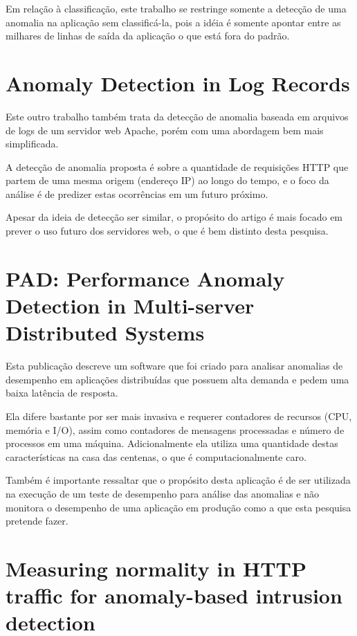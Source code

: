 Em relação à classificação, este trabalho se restringe somente a detecção de uma
anomalia na aplicação sem classificá-la, pois a idéia é somente apontar entre as
milhares de linhas de saída da aplicação o que está fora do padrão.

\section{Anomaly Detection in Log Records \citep{rastogi}}
\label{sec:anomaly-detection-in-log-records}

Este outro trabalho também trata da detecção de anomalia baseada em arquivos de
logs de um servidor web Apache, porém com uma abordagem bem mais simplificada.

A detecção de anomalia proposta é sobre a quantidade de requisições HTTP que
partem de uma mesma origem (endereço IP) ao longo do tempo, e o foco da análise
é de predizer estas ocorrências em um futuro próximo.

Apesar da ideia de detecção ser similar, o propósito do artigo é mais focado em
prever o uso futuro dos servidores web, o que é bem distinto desta pesquisa.

\section{PAD: Performance Anomaly Detection in Multi-server Distributed Systems \citep{pad}}
\label{sec:pad}

Esta publicação descreve um software que foi criado para analisar anomalias de
desempenho em aplicações distribuídas que possuem alta demanda e pedem uma baixa
latência de resposta.

Ela difere bastante por ser mais invasiva e requerer contadores de recursos
(CPU, memória e I/O), assim como contadores de mensagens processadas e número de
processos em uma máquina. Adicionalmente ela utiliza uma quantidade destas
características na casa das centenas, o que é computacionalmente caro.

Também é importante ressaltar que o propósito desta aplicação é de ser utilizada
na execução de um teste de desempenho para análise das anomalias e não monitora
o desempenho de uma aplicação em produção como a que esta pesquisa pretende fazer.

\section{Measuring normality in HTTP traffic for anomaly-based intrusion detection \citep{tapiador}}
\label{sec:measuring-normality-in-http-traffic-for-anomaly-based-intrusion-detection}

